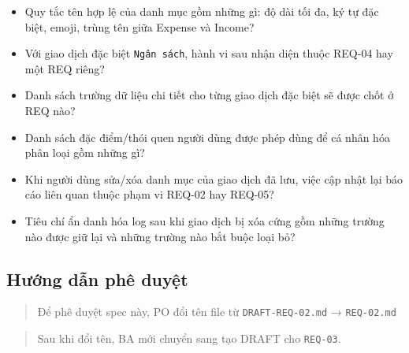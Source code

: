\begin{itemize}
\item [ ] Quy tắc tên hợp lệ của danh mục gồm những gì: độ dài tối đa, ký tự đặc biệt, emoji, trùng tên giữa Expense và Income?
\item [ ] Với giao dịch đặc biệt \texttt{Ngân sách}, hành vi sau nhận diện thuộc REQ-04 hay một REQ riêng?
\item [ ] Danh sách trường dữ liệu chi tiết cho từng giao dịch đặc biệt sẽ được chốt ở REQ nào?
\item [ ] Danh sách đặc điểm/thói quen người dùng được phép dùng để cá nhân hóa phân loại gồm những gì?
\item [ ] Khi người dùng sửa/xóa danh mục của giao dịch đã lưu, việc cập nhật lại báo cáo liên quan thuộc phạm vi REQ-02 hay REQ-05?
\item [ ] Tiêu chí ẩn danh hóa log sau khi giao dịch bị xóa cứng gồm những trường nào được giữ lại và những trường nào bắt buộc loại bỏ?
\end{itemize}
\subsection{Hướng dẫn phê duyệt}

\begin{quote}
Để phê duyệt spec này, PO đổi tên file từ \texttt{DRAFT-REQ-02.md} → \texttt{REQ-02.md}
\end{quote}

\begin{quote}
Sau khi đổi tên, BA mới chuyển sang tạo DRAFT cho \texttt{REQ-03}.
\end{quote}